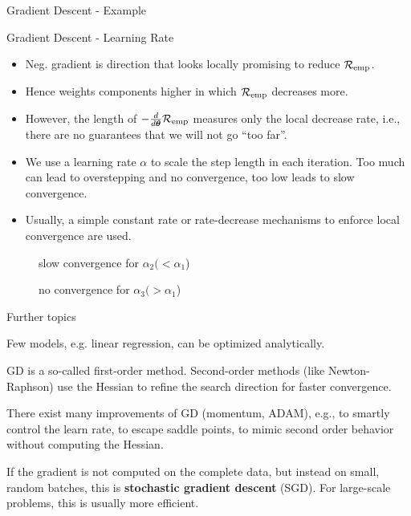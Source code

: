 \documentclass[11pt,compress,t,notes=noshow, xcolor=table]{beamer}
\begin{document}
\begin{frame}{Gradient Descent - Example}
\vfill
{}
\end{frame}


\begin{frame}{Gradient Descent - Learning Rate}
\footnotesize
\begin{itemize}
  \item Neg. gradient is direction that looks locally promising to reduce $\mathcal{R}_{\text{emp}}$.
  \item Hence weights components higher in which $\mathcal{R}_{\text{emp}}$ decreases more.
  \item However, the length of $-\frac{d}{d\bm{\theta}}{\mathcal{R}_{\text{emp}}}$ measures only the local decrease rate, i.e., there are no guarantees that we will not go ``too far''.
  \item We use a learning rate $\alpha$ to scale the step length in each iteration. Too much can lead to overstepping and no convergence, too low leads to slow convergence.
  \item Usually, a simple constant rate or rate-decrease mechanisms to enforce local convergence are used.
\end{itemize}
\begin{figure}[!htb]
{
\caption*{\tiny slow convergence for $\alpha_2 (< \alpha_1$)}
}
{
\caption*{\tiny no convergence for $\alpha_3 (> \alpha_1$)}
}
\end{figure}
\end{frame}

\begin{framei}{Further topics}
\item Few models, e.g. linear regression, can be optimized analytically. 
\item GD is a so-called first-order method. Second-order methods (like Newton-Raphson) use the Hessian to refine the search direction for faster convergence.
\item There exist many improvements of GD (momentum, ADAM), e.g., to smartly control the learn rate, to escape saddle points, to mimic second order behavior without computing the Hessian.
\item If the gradient is not computed on the complete data, but instead on small, random batches, this is \textbf{stochastic gradient descent} (SGD). For large-scale problems, this is usually more efficient.
\end{framei}

\endlecture
\end{document}
